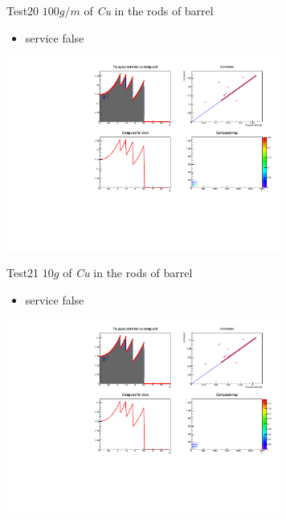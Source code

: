 \documentclass[pdftex, 11pt]{beamer}
\begin{document}
\begin{frame}
  \begin{block}{Test20}
    \alert{$100 g/m$} of \emph{Cu} in the rods of barrel
    \begin{itemize}
    \item \alert{service} false
    \end{itemize}
  \end{block}
  \begin{center}
    \includegraphics[width=9cm]{img/test20.pdf}
  \end{center}
\end{frame}

\begin{frame}
  \begin{block}{Test21}
    \alert{$10 g$} of \emph{Cu} in the rods of barrel
    \begin{itemize}
    \item \alert{service} false
    \end{itemize}
  \end{block}
  \begin{center}
    \includegraphics[width=9cm]{img/test21.pdf}
  \end{center}
\end{frame}
\end{document}
